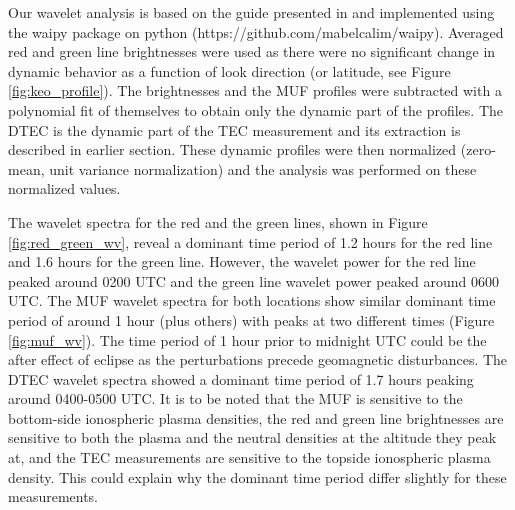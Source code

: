 Our wavelet analysis is based on the guide presented in \citet{torrence_wavelet} and implemented using the waipy package on python (https://github.com/mabelcalim/waipy). Averaged red and green line brightnesses were used  as there were no significant change in dynamic behavior as a function of look direction (or latitude, see Figure \ref{fig:keo_profile}). The brightnesses and the MUF profiles were subtracted with a polynomial fit of themselves to obtain only the dynamic part of the profiles. The DTEC is the dynamic part of the TEC measurement and its extraction is described in earlier section. These dynamic profiles were then normalized (zero-mean, unit variance normalization) and the analysis was performed on these normalized values. 
 
The wavelet spectra for the red and the green lines, shown in Figure \ref{fig:red_green_wv}, reveal a dominant time period of 1.2 hours for the red line and 1.6 hours for the green line. However, the wavelet power for the red line peaked around 0200 UTC and the green line wavelet power peaked around 0600 UTC. The MUF wavelet spectra for both locations show similar dominant time period of around 1 hour (plus others) with peaks at two different times (Figure \ref{fig:muf_wv}). The time period of 1 hour prior to midnight UTC could be the after effect of eclipse as the perturbations precede geomagnetic disturbances. The DTEC wavelet spectra showed a dominant time period of 1.7 hours peaking around 0400-0500 UTC.  It is to be noted that the MUF is sensitive to the bottom-side ionospheric plasma densities, the red and green line brightnesses are sensitive to both the plasma and the neutral densities at the altitude they peak at, and the TEC measurements are sensitive to the topside ionospheric plasma density. This could explain why the dominant time period differ slightly for these measurements.
